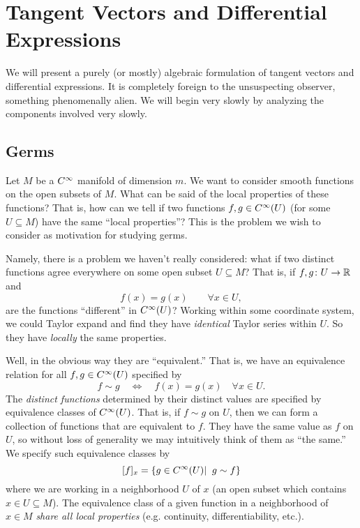 \section{Tangent Vectors and Differential Expressions}
We will present a purely (or mostly) algebraic formulation of
tangent vectors and differential expressions. It is completely
foreign to the unsuspecting observer, something phenomenally
alien. We will begin very slowly by analyzing the components
involved very slowly. 

\subsection{Germs}
Let $M$ be a $\diff$ manifold of dimension $m$. We want to
consider smooth functions on the open subsets of $M$. What can be
said of the local properties of these functions? That is, how can
we tell if two functions $f,g\in\diff(U)$ (for some $U\subseteq
M$) have the same ``local properties''? This is the problem we
wish to consider as motivation for studying germs.

Namely, there is a problem we haven't really considered: what if two
distinct functions agree everywhere on some open subset
$U\subseteq M$? That is, if $f,g\colon U\to \Bbb{R}$ and
\begin{equation}
f(x)=g(x)\qquad\forall x\in U,
\end{equation}
are the functions ``different'' in $\diff(U)$? Working within
some coordinate system, we could Taylor expand and find they have
\emph{identical} Taylor series within $U$. So they have
\emph{locally} the same properties.

Well, in the obvious way they are ``equivalent.'' That is, we
have an equivalence relation for all $f,g\in\diff(U)$ specified
by
\begin{equation}\label{eq:germEquivRel}
f\sim g\quad\iff\quad f(x)=g(x)\quad\forall x\in U.
\end{equation}
The \emph{distinct functions} determined by their distinct values
are specified by equivalence classes of $\diff(U)$. That is,
if $f\sim g$ on $U$, then we can form a collection of functions
that are equivalent to $f$. They have the same value as $f$ on
$U$, so without loss of generality we may intuitively think of
them as ``the same.'' We specify such equivalence classes by
\begin{equation}\label{eq:germEquivClass}
\eqclass{f}{x}=\left\{g\in\diff(U)|\;\;g\sim f\right\}
\end{equation}
where we are working in a neighborhood $U$ of $x$ (an open subset
which contains $x\in U\subseteq M$). The equivalence class of a
given function in a neighborhood of $x\in M$ \emph{share all
  local properties} (e.g. continuity, differentiability, etc.).

